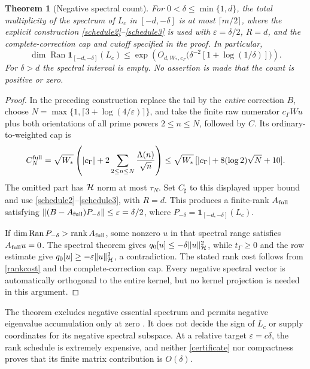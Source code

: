\documentclass[11pt]{article}
\newtheorem{theorem}{Theorem}[section]\newtheorem{lemma}[theorem]{Lemma}\newtheorem{corollary}[theorem]{Corollary}
\begin{document}
\begin{theorem}[Negative spectral count]\label{count}
For $0<\delta\le\min\{1,d\}$, the total multiplicity of the spectrum of $L_c$ in $[-d,-\delta]$ is at most $\lceil m/2\rceil$, where the explicit construction \eqref{schedule2}--\eqref{schedule3} is used with $\varepsilon=\delta/2$, $R=d$, and the \emph{complete-correction} cap and cutoff specified in the proof. In particular,
\[\dim\operatorname{Ran}\mathbf1_{[-d,-\delta]}(L_c)
 \le\exp\!\left(O_{d,W_*,c_\Gamma}\bigl(\delta^{-2}[1+\log(1/\delta)]\bigr)\right).
\]
For $\delta>d$ the spectral interval is empty. No assertion is made that the count is positive or zero.
\end{theorem}
\begin{proof}
In the preceding construction replace the tail by the \emph{entire} correction $B$, choose $N=\max\{1,\lceil3+\log(4/\varepsilon)\rceil\}$, and take the finite raw numerator $c_\Gamma Wu$ plus both orientations of all prime powers $2\le n\le N$, followed by $C$. Its ordinary-to-weighted cap is
\[C_N^{\rm full}=\sqrt{W_*}\left(|c_\Gamma|+2\sum_{2\le n\le N}\frac{\Lambda(n)}{\sqrt n}\right)
 \le\sqrt{W_*}\,[|c_\Gamma|+8(\log2)\sqrt N+10].\]
The omitted part has $\mathcal H$ norm at most $\tau_N$. Set $C_\sharp$ to this displayed upper bound and use \eqref{schedule2}--\eqref{schedule3}, with $R=d$. This produces a finite-rank $A_{\rm full}$ satisfying $\lVert(B-A_{\rm full})P_{-\delta}\rVert\le\varepsilon=\delta/2$, where $P_{-\delta}=\mathbf1_{[-d,-\delta]}(L_c)$.

If $\dim\operatorname{Ran}P_{-\delta}>\operatorname{rank}A_{\rm full}$, some nonzero $u$ in that spectral range satisfies $A_{\rm full}u=0$. The spectral theorem gives $q_0[u]\le-\delta\lVert u\rVert_{\mathcal H}^2$, while $t_\Gamma\ge0$ and the row estimate give $q_0[u]\ge-\varepsilon\lVert u\rVert_{\mathcal H}^2$, a contradiction. The stated rank cost follows from \eqref{rankcost} and the complete-correction cap. Every negative spectral vector is automatically orthogonal to the entire kernel, but no kernel projection is needed in this argument.
\end{proof}
The theorem excludes negative essential spectrum and permits negative eigenvalue accumulation only at zero \cite{reed}. It does not decide the sign of $L_c$ or supply coordinates for its negative spectral subspace. At a relative target $\varepsilon=c\delta$, the rank schedule is extremely expensive, and neither \eqref{certificate} nor compactness proves that its finite matrix contribution is $O(\delta)$.
\end{document}
